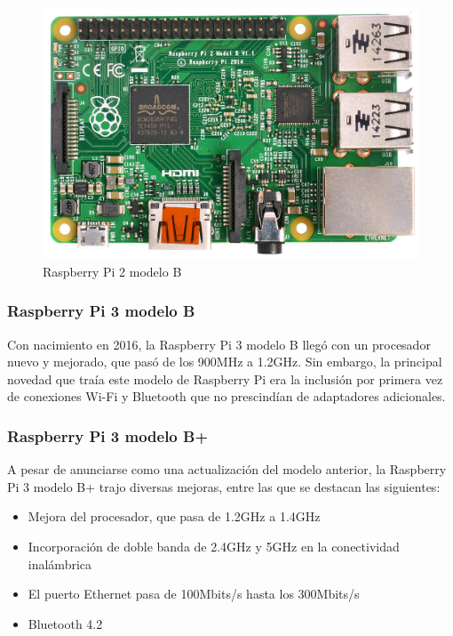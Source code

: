 \begin{figure}[tbp]
\centering
\includegraphics[scale = 1]{fig/Raspberry-Pi-2-modelo-B.jpg}
\caption{Raspberry Pi 2 modelo B}
\label{fig:raspberry-pi-2-modelo-B}
\end{figure}

\subsubsection{Raspberry Pi 3 modelo B}

\noindent Con nacimiento en 2016, la Raspberry Pi 3 modelo B llegó con un procesador nuevo y mejorado, que pasó de los 900MHz a 1.2GHz. Sin embargo, la principal novedad que traía este modelo de Raspberry Pi era la inclusión por primera vez de conexiones Wi-Fi y Bluetooth que no prescindían de adaptadores adicionales.

\subsubsection{Raspberry Pi 3 modelo B+}

\noindent A pesar de anunciarse como una actualización del modelo anterior, la Raspberry Pi 3 modelo B+ trajo diversas mejoras, entre las que se destacan las siguientes:
\begin{itemize}
\item{Mejora del procesador, que pasa de 1.2GHz a 1.4GHz}
\item{Incorporación de doble banda de 2.4GHz y 5GHz en la conectividad inalámbrica}
\item{El puerto Ethernet pasa de 100Mbits/s hasta los 300Mbits/s}
\item{Bluetooth 4.2}
\end{itemize}

